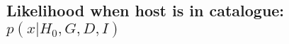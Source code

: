 \documentclass[a4paper,10pt]{article}
\begin{document}
\subsection{Likelihood when host is in catalogue: $p(x|H_0,G,D,I)$}
%
%
\end{document}
